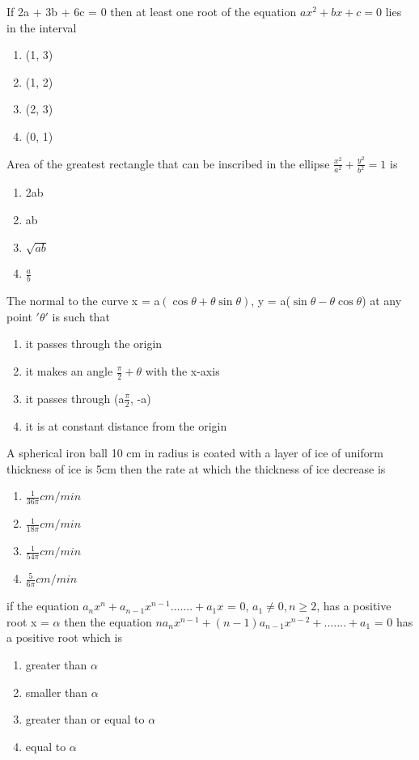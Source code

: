 \item If 2a + 3b + 6c = 0 then at least one root of the equation $ax^2 + bx + c = 0$ lies in the interval
\begin{enumerate}
\item (1, 3)
\item (1, 2)
\item (2, 3)
\item (0, 1)
\end{enumerate}

\item Area of the greatest rectangle that can be inscribed in the ellipse $\frac{x^2}{a^2} + \frac{y^2}{b^2} = 1$ is 
\begin{enumerate}
\item 2ab
\item ab
\item $\sqrt{ab}$
\item $\frac{a}{b}$
\end{enumerate}

\item The normal to the curve x = a$(\cos \theta + \theta \sin \theta)$, y = a($\sin \theta - \theta \cos \theta$) at any point $'\theta'$ is such that
\begin{enumerate}
\item it passes through the origin 
\item it makes an angle $\frac{\pi}{2} + \theta$ with the x-axis
\item it passes through (a$\frac{\pi}{2}$, -a)
\item it is at constant distance from the origin
\end{enumerate}

\item A spherical iron ball 10 cm in radius is coated with a layer of ice of uniform thickness of ice is 5cm then the rate at which the thickness of ice decrease is 
\begin{enumerate}
\item $\frac{1}{36\pi} cm/min$
\item $\frac{1}{18\pi} cm/min$
\item $\frac{1}{54\pi} cm/min$
\item $\frac{5}{6\pi} cm/min$
\end{enumerate}

\item if the equation $a_nx^n + a_{n - 1}x^{n - 1}.......+a_1x$ = 0, $a_1 \neq 0,n\geq 2$, has a positive root 
x = $\alpha$ then the equation $na_n x^{n - 1} + (n - 1)a_{n - 1}x^{n - 2}+.......+ a_1$ = 0 has a positive root which is 
\begin{enumerate}
\item greater than $\alpha$
\item smaller than $\alpha$
\item greater than or equal to $\alpha$
\item equal to $\alpha$
\end{enumerate}

